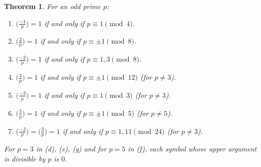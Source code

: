 \documentclass[11pt]{article}
\theoremstyle{ntstyle}
\newtheorem{theorem}{Theorem}[subsection]
\newcommand{\legs}[2]{\bigl(\tfrac{#1}{#2}\bigr)}
\begin{document}
\begin{theorem}\label{thm:7.5.2} For an odd prime $p$:

	\begin{enumerate}[label={\alph*)}]
		\item $\legs{-1}{p} = 1$ if and only if $p \equiv 1 \pmod{4}$.
		\item $\legs{2}{p} = 1$ if and only if $p \equiv \pm 1 \pmod{8}$.
		\item $\legs{-2}{p} = 1$ if and only if $p \equiv 1, 3 \pmod{8}$.
		\item $\legs{3}{p} = 1$ if and only if $p \equiv \pm 1
						\pmod{12}$ (for $p \neq 3$).
		\item $\legs{-3}{p} = 1$ if and only if $p \equiv 1 \pmod{3}$
					(for $p \neq 3$).
		\item $\legs{5}{p} = 1$ if and only if $p \equiv \pm 1 \pmod{5}$ (for $p \neq
						5$).
		\item $\legs{-2}{p} = \legs{3}{p} = 1$
						if and only if $p \equiv 1, 11 \pmod{24}$ (for $p \neq 3$).
	\end{enumerate}

	For $p = 3$ in (d), (e), (g) and for $p = 5$ in (f), each symbol whose
	upper argument is divisible by $p$ is $0$.
\end{theorem}
\end{document}
